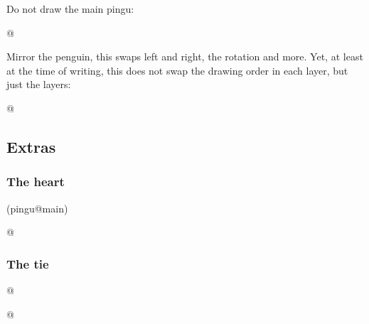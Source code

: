 \documentclass[parskip=half,english,numbers=noenddot,footnotes=nomultiple,oneside]{scrartcl}
\def\cursub{}
\begin{document}
	Do not draw the main pingu:
\begin{tcblisting}{@}
\end{tcblisting}
\endkeyexplain

	Mirror the penguin, this swaps left and right, the rotation and more.
	Yet, at least at the time of writing, this does not swap the drawing order in each layer, but just the layers:
\begin{tcblisting}{@}
\begin{tikzpicture}
	\pingu[:back, left wing wave,
	       cane left, left item angle=70]
\end{tikzpicture}
\end{tcblisting}
\endkeyexplain

\def\cursub{}

\subsection{Extras}
\subsubsection{The heart}
(pingu@main)
\begin{tcblisting}{@}
\begin{tikzpicture}
	\pingu[heart=green]
\end{tikzpicture}
\end{tcblisting}
\endshowkeyexplain

\subsubsection{The tie}
\begin{tcblisting}{@}
\begin{tikzpicture}
	\pingu[tie]
\end{tikzpicture}
\end{tcblisting}
\endshowkeyexplain

{\def\pingu@color@tie{<tie-color>}
\begin{tcblisting}{@}
\begin{tikzpicture}
	\pingu[tie, tie knot=orange]
\end{tikzpicture}
\end{tcblisting}
\endsubkeyexplain
}
\end{document}
